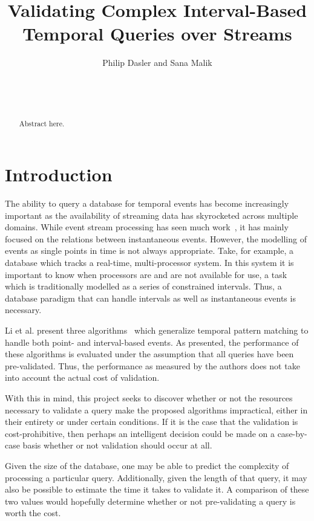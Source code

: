 \documentclass{acm_proc_article-sp}
\title{Validating Complex Interval-Based Temporal Queries over Streams}
\author{
\alignauthor
Philip Dasler and Sana Malik\\
       \affaddr{Department of Computer Science}\\
       \affaddr{University of Maryland}\\
       \affaddr{College Park, MD 20740}\\
       \email{\{daslerpc, maliks\}@cs.umd.edu}
 }
\begin{document}
\maketitle
\begin{abstract}
Abstract here.
\end{abstract}

\section{Introduction}
The ability to query a database for temporal events has become increasingly important as the availability of streaming data has skyrocketed across multiple domains.  While event stream processing has seen much work~\cite{Agrawal:2008, Akdere:2008, Ding:2008, Wu:2006, Brenna:2007, Li:2009, Li:2010, Liu:2009}, it has mainly focused on the relations between instantaneous events.  However, the modelling of events as single points in time is not always appropriate.  Take, for example, a database which tracks a real-time, multi-processor system.  In this system it is important to know when processors are and are not available for use, a task which is traditionally modelled as a series of constrained intervals.  Thus, a database paradigm that can handle intervals as well as instantaneous events is necessary.

Li et al. present three algorithms~\cite{Li:2011} which generalize temporal pattern matching to handle both point- and interval-based events.  As presented, the performance of these algorithms is evaluated under the assumption that all queries have been pre-validated.  Thus, the performance as measured by the authors does not take into account the actual cost of validation.

With this in mind, this project seeks to discover whether or not the resources necessary to validate a query make the proposed algorithms impractical, either in their entirety or under certain conditions.  If it is the case that the validation is cost-prohibitive, then perhaps an intelligent decision could be made on a case-by-case basis whether or not validation should occur at all.  

Given the size of the database, one may be able to predict the complexity of processing a particular query.  Additionally, given the length of that query, it may also be possible to estimate the time it takes to validate it.  A comparison of these two values would hopefully determine whether or not pre-validating a query is worth the cost.  
\end{document}

